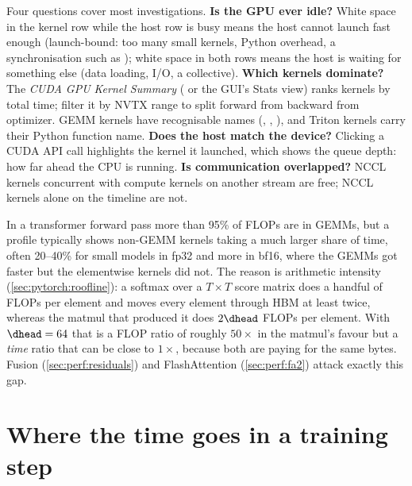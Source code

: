 Four questions cover most investigations. \textbf{Is the GPU ever idle?} White space in the
kernel row while the host row is busy means the host cannot launch fast enough (launch-bound:
too many small kernels, Python overhead, a synchronisation such as ); white space in
both rows means the host is waiting for something else (data loading, I/O, a collective).
\textbf{Which kernels dominate?} The \emph{CUDA GPU Kernel Summary} ( or the GUI's
Stats view) ranks kernels by total time; filter it by NVTX range to split forward from backward
from optimizer. GEMM kernels have recognisable names (,
, ), and Triton kernels carry their Python
function name. \textbf{Does the host match the device?} Clicking a CUDA API call highlights the
kernel it launched, which shows the queue depth: how far ahead the CPU is running. \textbf{Is
communication overlapped?} NCCL kernels concurrent with compute kernels on another stream are
free; NCCL kernels alone on the timeline are not.

\begin{systemslens}
In a transformer forward pass more than 95\% of FLOPs are in GEMMs, but a profile typically shows
non-GEMM kernels taking a much larger share of time, often 20--40\% for small models in fp32 and more
in bf16, where the GEMMs got faster but the elementwise kernels did not. The reason is arithmetic
intensity (\cref{sec:pytorch:roofline}): a softmax over a $T\times T$ score matrix does a handful of
FLOPs per element and moves every element through HBM at least twice, whereas the matmul that
produced it does $2\dhead$ FLOPs per element. With $\dhead=64$ that is a FLOP ratio of roughly
$50\times$ in the matmul's favour but a \emph{time} ratio that can be close to $1\times$, because both
are paying for the same bytes. Fusion (\cref{sec:perf:residuals}) and FlashAttention
(\cref{sec:perf:fa2}) attack exactly this gap.
\end{systemslens}

\section{Where the time goes in a training step}\label{sec:perf:anatomy}

